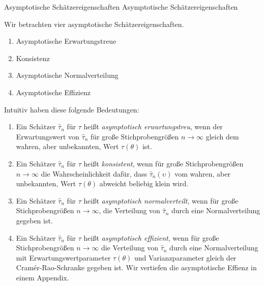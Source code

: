 \documentclass[
  8pt,
  ignorenonframetext,
]{beamer}
\providecommand{\tightlist}{%
  \setlength{\itemsep}{0pt}\setlength{\parskip}{0pt}}
\newcommand{\ups} {\upsilon}
\begin{document}
\begin{frame}{Asymptotische Schätzereigenschaften}
\protect\hypertarget{asymptotische-schuxe4tzereigenschaften-1}{}
Asymptotische Schätzereigenschaften

\footnotesize

Wir betrachten vier asymptotische Schätzereigenschaften.

\begin{enumerate}
[(1)]
\tightlist
\item
  Asymptotische Erwartungstreue
\item
  Konsistenz
\item
  Asymptotische Normalverteilung
\item
  Asymptotische Effizienz
\end{enumerate}

Intuitiv haben diese folgende Bedeutungen:

\begin{enumerate}
[(1)]
\item
  \justifying Ein Schätzer \(\hat{\tau}_n\) für \(\tau\) heißt
  \emph{asymptotisch erwartungstreu}, wenn der Erwartungswert von
  \(\hat{\tau}_n\) für große Stichprobengrößen \(n \to \infty\) gleich
  dem wahren, aber unbekannten, Wert \(\tau(\theta)\) ist.
\item
  Ein Schätzer \(\hat{\tau}_n\) für \(\tau\) heißt \emph{konsistent},
  wenn für große Stichprobengrößen \(n \to \infty\) die
  Wahrscheinlichkeit dafür, dass \(\hat{\tau}_n(\ups)\) vom wahren, aber
  unbekannten, Wert \(\tau(\theta)\) abweicht beliebig klein wird.
\item
  Ein Schätzer \(\hat{\tau}_n\) für \(\tau\) heißt \emph{asymptotisch
  normalverteilt}, wenn für große Stichprobengrößen \(n \to \infty\),
  die Verteilung von \(\hat{\tau}_n\) durch eine Normalverteilung
  gegeben ist.
\item
  Ein Schätzer \(\hat{\tau}_n\) für \(\tau\) heißt \emph{asymptotisch
  effizient}, wenn für große Stichprobengrößen \(n \to \infty\) die
  Verteilung von \(\hat{\tau}_n\) durch eine Normalverteilung mit
  Erwartungswertparameter \(\tau(\theta)\) und Varianzparameter gleich
  der Cramér-Rao-Schranke gegeben ist. Wir vertiefen die asymptotische
  Effienz in einem Appendix.
\end{enumerate}
\end{frame}
\end{document}
